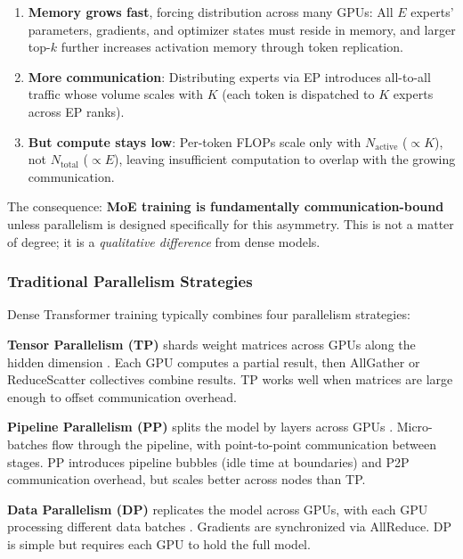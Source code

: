 \documentclass[10pt,logo,copyright]{nvidiatechreport}
\begin{document}
\begin{enumerate}
    \item \textbf{Memory grows fast}, forcing distribution across many GPUs: All $E$ experts' parameters, gradients, and optimizer states must reside in memory, and larger top-$k$ further increases activation memory through token replication.
    \item \textbf{More communication}: Distributing experts via EP introduces all-to-all traffic whose volume scales with $K$ (each token is dispatched to $K$ experts across EP ranks).
    \item \textbf{But compute stays low}: Per-token FLOPs scale only with $N_{\text{active}}$ ($\propto K$), not $N_{\text{total}}$ ($\propto E$), leaving insufficient computation to overlap with the growing communication.
\end{enumerate}

The consequence: \textbf{MoE training is fundamentally communication-bound} unless parallelism is designed specifically for this asymmetry. This is not a matter of degree; it is a \emph{qualitative difference} from dense models.

\subsubsection{Traditional Parallelism Strategies}\label{sec:traditional-parallelism}

Dense Transformer training typically combines four parallelism strategies:

\textbf{Tensor Parallelism (TP)} shards weight matrices across GPUs along the hidden dimension \cite{shoeybi2020megatronlmtrainingmultibillionparameter}. Each GPU computes a partial result, then AllGather or ReduceScatter collectives combine results. TP works well when matrices are large enough to offset communication overhead.

\textbf{Pipeline Parallelism (PP)} splits the model by layers across GPUs \cite{huang2019gpipe,narayanan2019pipedream,shoeybi2020megatronlmtrainingmultibillionparameter,qi2023zerobubblepipelineparallelism,qi2024pipelineparallelismcontrollablememory,zhang2022chimera,guan2025pipeoptimensuringeffective1f1b}. Micro-batches flow through the pipeline, with point-to-point communication between stages. PP introduces pipeline bubbles (idle time at boundaries) and P2P communication overhead, but scales better across nodes than TP.

\textbf{Data Parallelism (DP)} replicates the model across GPUs, with each GPU processing different data batches \cite{shallue2019measuringeffectsdataparallelism,bai2022moderndistributeddataparallellargescale}. Gradients are synchronized via AllReduce. DP is simple but requires each GPU to hold the full model.
\end{document}
